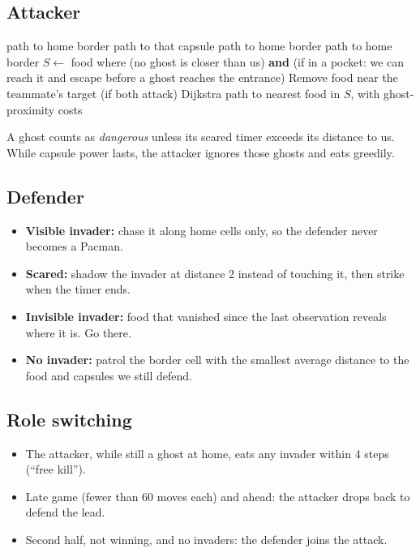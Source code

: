 \documentclass[11pt,a4paper]{article}
\begin{document}
\subsection{Attacker}
\begin{algorithm}[H]
\caption{Attacker goal selection (each turn)}
\begin{algorithmic}[1]
  \State \Return path to home border
\EndIf
{}
   \State \Return path to that capsule \EndIf
   \State \Return path to home border \EndIf
\EndIf
{} \State \Return path to home border \EndIf
\State $S \gets$ food where (no ghost is closer than us) \textbf{and}
       (if in a pocket: we can reach it and escape before a ghost reaches the entrance)
\State Remove food near the teammate's target (if both attack)
\State \Return Dijkstra path to nearest food in $S$, with ghost-proximity costs
\end{algorithmic}
\end{algorithm}

\noindent A ghost counts as \emph{dangerous} unless its scared timer exceeds its distance to us.
While capsule power lasts, the attacker ignores those ghosts and eats greedily.

\subsection{Defender}
\begin{itemize}
  \item \textbf{Visible invader:} chase it along home cells only, so the defender never becomes a Pacman.
  \item \textbf{Scared:} shadow the invader at distance 2 instead of touching it, then strike when the timer ends.
  \item \textbf{Invisible invader:} food that vanished since the last observation reveals where it is. Go there.
  \item \textbf{No invader:} patrol the border cell with the smallest average distance to the food and capsules we still defend.
\end{itemize}

\subsection{Role switching}
\begin{itemize}
  \item The attacker, while still a ghost at home, eats any invader within 4 steps (``free kill'').
  \item Late game (fewer than 60 moves each) and ahead: the attacker drops back to defend the lead.
  \item Second half, not winning, and no invaders: the defender joins the attack.
\end{itemize}
\end{document}
